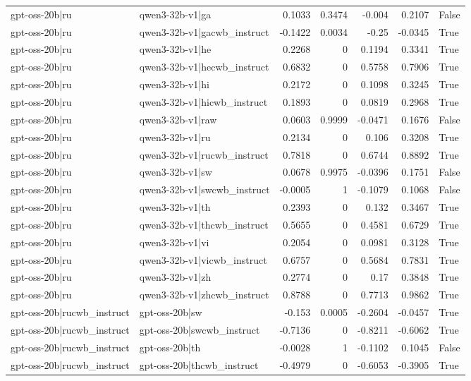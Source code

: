 \begin{table}
\begin{tabular}{l l r r r r l}
gpt-oss-20b|ru & qwen3-32b-v1|ga & 0.1033 & 0.3474 & -0.004 & 0.2107 & False \\
gpt-oss-20b|ru & qwen3-32b-v1|gacwb_instruct & -0.1422 & 0.0034 & -0.25 & -0.0345 & True \\
gpt-oss-20b|ru & qwen3-32b-v1|he & 0.2268 & 0 & 0.1194 & 0.3341 & True \\
gpt-oss-20b|ru & qwen3-32b-v1|hecwb_instruct & 0.6832 & 0 & 0.5758 & 0.7906 & True \\
gpt-oss-20b|ru & qwen3-32b-v1|hi & 0.2172 & 0 & 0.1098 & 0.3245 & True \\
gpt-oss-20b|ru & qwen3-32b-v1|hicwb_instruct & 0.1893 & 0 & 0.0819 & 0.2968 & True \\
gpt-oss-20b|ru & qwen3-32b-v1|raw & 0.0603 & 0.9999 & -0.0471 & 0.1676 & False \\
gpt-oss-20b|ru & qwen3-32b-v1|ru & 0.2134 & 0 & 0.106 & 0.3208 & True \\
gpt-oss-20b|ru & qwen3-32b-v1|rucwb_instruct & 0.7818 & 0 & 0.6744 & 0.8892 & True \\
gpt-oss-20b|ru & qwen3-32b-v1|sw & 0.0678 & 0.9975 & -0.0396 & 0.1751 & False \\
gpt-oss-20b|ru & qwen3-32b-v1|swcwb_instruct & -0.0005 & 1 & -0.1079 & 0.1068 & False \\
gpt-oss-20b|ru & qwen3-32b-v1|th & 0.2393 & 0 & 0.132 & 0.3467 & True \\
gpt-oss-20b|ru & qwen3-32b-v1|thcwb_instruct & 0.5655 & 0 & 0.4581 & 0.6729 & True \\
gpt-oss-20b|ru & qwen3-32b-v1|vi & 0.2054 & 0 & 0.0981 & 0.3128 & True \\
gpt-oss-20b|ru & qwen3-32b-v1|vicwb_instruct & 0.6757 & 0 & 0.5684 & 0.7831 & True \\
gpt-oss-20b|ru & qwen3-32b-v1|zh & 0.2774 & 0 & 0.17 & 0.3848 & True \\
gpt-oss-20b|ru & qwen3-32b-v1|zhcwb_instruct & 0.8788 & 0 & 0.7713 & 0.9862 & True \\
gpt-oss-20b|rucwb_instruct & gpt-oss-20b|sw & -0.153 & 0.0005 & -0.2604 & -0.0457 & True \\
gpt-oss-20b|rucwb_instruct & gpt-oss-20b|swcwb_instruct & -0.7136 & 0 & -0.8211 & -0.6062 & True \\
gpt-oss-20b|rucwb_instruct & gpt-oss-20b|th & -0.0028 & 1 & -0.1102 & 0.1045 & False \\
gpt-oss-20b|rucwb_instruct & gpt-oss-20b|thcwb_instruct & -0.4979 & 0 & -0.6053 & -0.3905 & True \\

\end{tabular}
\end{table}
